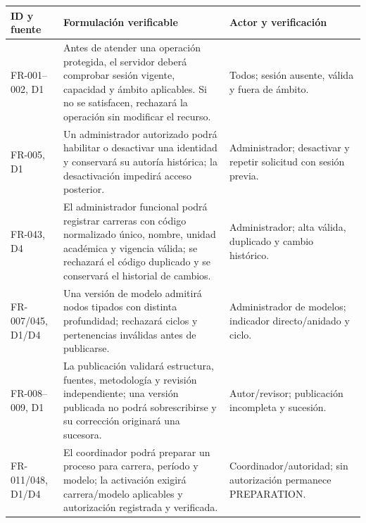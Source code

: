 \documentclass[12pt,a4paper]{report}
\begin{document}
{\def\LTcaptype{none} %
\begin{longtable}[]{@{}
  >{\raggedright\arraybackslash}p{}
  >{\raggedright\arraybackslash}p{}
  >{\raggedright\arraybackslash}p{}@{}}
\toprule\noalign{}
\begin{minipage}[b]{\linewidth}\raggedright
ID y fuente
\end{minipage} & \begin{minipage}[b]{\linewidth}\raggedright
Formulación verificable
\end{minipage} & \begin{minipage}[b]{\linewidth}\raggedright
Actor y verificación
\end{minipage} \\
\midrule\noalign{}
\endhead
\bottomrule\noalign{}
\endlastfoot
FR-001--002, D1 & Antes de atender una operación protegida, el servidor
deberá comprobar sesión vigente, capacidad y ámbito aplicables. Si no se
satisfacen, rechazará la operación sin modificar el recurso. & Todos;
sesión ausente, válida y fuera de ámbito. \\
FR-005, D1 & Un administrador autorizado podrá habilitar o desactivar
una identidad y conservará su autoría histórica; la desactivación
impedirá acceso posterior. & Administrador; desactivar y repetir
solicitud con sesión previa. \\
FR-043, D4 & El administrador funcional podrá registrar carreras con
código normalizado único, nombre, unidad académica y vigencia válida; se
rechazará el código duplicado y se conservará el historial de cambios. &
Administrador; alta válida, duplicado y cambio histórico. \\
FR-007/045, D1/D4 & Una versión de modelo admitirá nodos tipados con
distinta profundidad; rechazará ciclos y pertenencias inválidas antes de
publicarse. & Administrador de modelos; indicador directo/anidado y
ciclo. \\
FR-008--009, D1 & La publicación validará estructura, fuentes,
metodología y revisión independiente; una versión publicada no podrá
sobrescribirse y su corrección originará una sucesora. & Autor/revisor;
publicación incompleta y sucesión. \\
FR-011/048, D1/D4 & El coordinador podrá preparar un proceso para
carrera, período y modelo; la activación exigirá carrera/modelo
aplicables y autorización registrada y verificada. &
Coordinador/autoridad; sin autorización permanece PREPARATION. \\

\end{longtable}}
\end{document}
